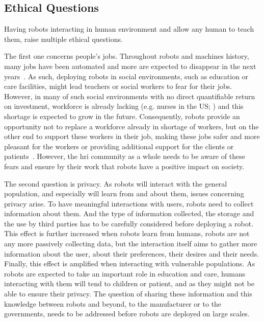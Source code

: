 \subsection{Ethical Questions} \label{sec:disc_ethics}

Having robots interacting in human environment and allow any human to teach them, raise multiple ethical questions.

The first one concerns people's jobs. Throughout robots and machines history, many jobs have been automated and more are expected to disappear in the next years~\citep{frey2017future}. As such, deploying robots in social environments, such as education or care facilities, might lead teachers or social workers to fear for their jobs. However, in many of such social environments with no direct quantifiable return on investment, workforce is already lacking (e.g. nurses in the US; \citealt{nevidjon2001nursing}) and this shortage is expected to grow in the future. Consequently, robots provide an opportunity not to replace a workforce already in shortage of workers, but on the other end to support these workers in their job, making these jobs safer and more pleasant for the workers or providing additional support for the clients or patients~\citep{wada2005psychological}. However, the \gls{hri} community as a whole needs to be aware of these fears and ensure by their work that robots have a positive impact on society.

The second question is privacy. As robots will interact with the general population, and especially will learn from and about them, issues concerning privacy arise. To have meaningful interactions with users, robots need to collect information about them. And the type of information collected, the storage and the use by third parties has to be carefully considered before deploying a robot. This effect is further increased when robots learn from humans, robots are not any more passively collecting data, but the interaction itself aims to gather more information about the user, about their preferences, their desires and their needs. Finally, this effect is amplified when interacting with vulnerable populations. As robots are expected to take an important role in education and care, humans interacting with them will tend to children or patient, and as they might not be able to ensure their privacy. The question of sharing these information and this knowledge between robots and beyond, to the manufacturer or to the governments, needs to be addressed before robots are deployed on large scales.

